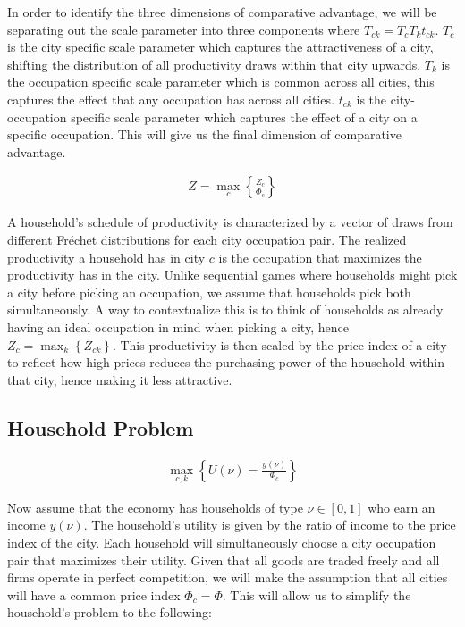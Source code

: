 \documentclass[10pt]{article}
\begin{document}
In order to identify the three dimensions of comparative advantage, we will be separating out the scale parameter into three components where $T_{ck} = T_c T_k t_{ck}$. $T_c$ is the city specific scale parameter which captures the attractiveness of a city, shifting the distribution of all productivity draws within that city upwards. $T_k$ is the occupation specific scale parameter which is common across all cities, this captures the effect that any occupation has across all cities. $t_{ck}$ is the city-occupation specific scale parameter which captures the effect of a city on a specific occupation. This will give us the final dimension of comparative advantage.

\begin{align*}
    Z = \max_c \left\{ \frac{Z_c}{\Phi_c} \right\}
\end{align*}

A household's schedule of productivity is characterized by a vector of draws from different Fr\'{e}chet distributions for each city occupation pair. The realized productivity a household has in city $c$ is the occupation that maximizes the productivity has in the city. Unlike sequential games where households might pick a city before picking an occupation, we assume that households pick both simultaneously. A way to contextualize this is to think of households as already having an ideal occupation in mind when picking a city, hence $Z_c = \max_k \left\{ Z_{ck} \right\}$. This productivity is then scaled by the price index of a city to reflect how high prices reduces the purchasing power of the household within that city, hence making it less attractive.

\subsection{Household Problem}

\begin{align}
    \max_{c, k} \left\{U(\nu) = \frac{y(\nu)}{\Phi_c} \right\}
\end{align}

Now assume that the economy has households of type $\nu \in [0, 1]$ who earn an income $y(\nu)$. The household's utility is given by the ratio of income to the price index of the city. Each household will simultaneously choose a city occupation pair that maximizes their utility. Given that all goods are traded freely and all firms operate in perfect competition, we will make the assumption that all cities will have a common price index $\Phi_c = \Phi$. This will allow us to simplify the household's problem to the following:
\end{document}
